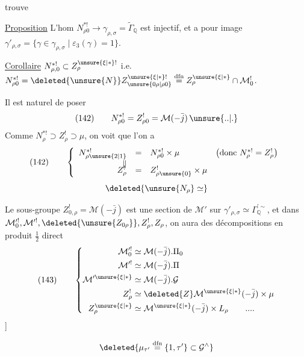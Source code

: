 
trouve

\uline{Proposition} L'hom
$N_{\rho0}^{*!}\longrightarrow\gamma_{\rho,\sigma}=\widetilde\Gamma_{\mathbb Q}$
est injectif, et a pour image
$\gamma'_{\rho,\sigma}=\{\gamma\in\gamma_{\rho,\sigma}\mid\varepsilon_3(\gamma)=1\}$.

\uline{Corollaire}
$N_{\rho,0}^{*!}\subset Z_{\rho}^{\unsure{\xi|*}!}$ i.e.
$N_{\rho0}^{*!}=\deleted{\unsure{N}}Z_{\unsure{0\rho|\rho0}}^{\unsure{\xi|*}!}
 \overset{\mathrm{dfn}}{=}Z_{\rho}^{\unsure{\xi|*}}\cap\mathcal M_0^!$.

Il est naturel de poser
\[
 (142)\qquad N_{\rho0}^{*!}=Z_{\rho0}^!=\mathcal M(-\bar j)\,\unsure{..|.}
\]
Comme $N_{\rho}^{*!}\supset Z_{\rho}^!\supset\mu$, on voit que l'on a
\[
 (142)\qquad
 \left\{\begin{array}{rcll}
 N_{\rho\unsure{2|1}}^{*!}&=&N_{\rho0}^{*!}\times\mu
     &\bigl(\text{donc }N_{\rho}^{*!}=Z_{\rho}^!\bigr)\\
 \Vert&&&\\[-1ex]
 Z_{\rho}^!&=&Z_{\rho\unsure{0}}^!\times\mu&
 \end{array}\right.
\]
\[
 \deleted{\unsure{N_{\rho}}\simeq}
\]

Le sous-groupe $Z^!_{0,\rho}=\mathcal M(-\bar j)$ est une section de
$\mathcal M'$ sur $\gamma'_{\rho,\sigma}\simeq\Gamma_{\mathbb Q}^{\prime\sim}$,
et  
 dans
$\mathcal M_0^{\prime!},\mathcal M^{\prime!},
 \deleted{\unsure{Z_{0\rho}}},Z_{\rho}^!,Z_{\rho}$,
on aura des décompositions en produit $\frac12$ direct
\[
 (143)\qquad
 \left\{\begin{aligned}
 \mathcal M_0^{\prime!}&\simeq\mathcal M(-\bar j).\Pi_0\\
 \mathcal M^{\prime!}&\simeq\mathcal M(-\bar j).\Pi\\
 \mathcal M^{\prime\unsure{\xi|*}}&\simeq\mathcal M(-\bar j).\mathcal G\\
 Z_{\rho}^!&\simeq\deleted{Z}\mathcal M^{\unsure{\xi|*}}(-\bar j)\times\mu\\
 Z_{\rho}^{\unsure{\xi|*}}&\simeq\mathcal M^{\unsure{\xi|*}}(-\bar j)\times L_{\rho}
 \qquad ....
 \end{aligned}\right.
\]
]

\[
 \deleted{\mu_{\tau'}\overset{\mathrm{dfn}}{=}\{1,\tau'\}\subset\mathcal G^{\wedge}}
\]

